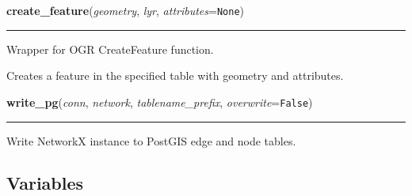     \label{nx_pg:create_feature}

    \vspace{0.5ex}

\hspace{.8\funcindent}\begin{boxedminipage}{\funcwidth}

    \raggedright \textbf{create\_feature}(\textit{geometry}, \textit{lyr}, \textit{attributes}={\tt None})

    \vspace{-1.5ex}

    \rule{\textwidth}{0.5\fboxrule}
\setlength{\parskip}{2ex}
    Wrapper for OGR CreateFeature function.

    Creates a feature in the specified table with geometry and attributes.

\setlength{\parskip}{1ex}
    \end{boxedminipage}

    \label{nx_pg:write_pg}

    \vspace{0.5ex}

\hspace{.8\funcindent}\begin{boxedminipage}{\funcwidth}

    \raggedright \textbf{write\_pg}(\textit{conn}, \textit{network}, \textit{tablename\_prefix}, \textit{overwrite}={\tt False})

    \vspace{-1.5ex}

    \rule{\textwidth}{0.5\fboxrule}
\setlength{\parskip}{2ex}
    Write NetworkX instance to PostGIS edge and node tables.

\setlength{\parskip}{1ex}
    \end{boxedminipage}



  \subsection{Variables}


